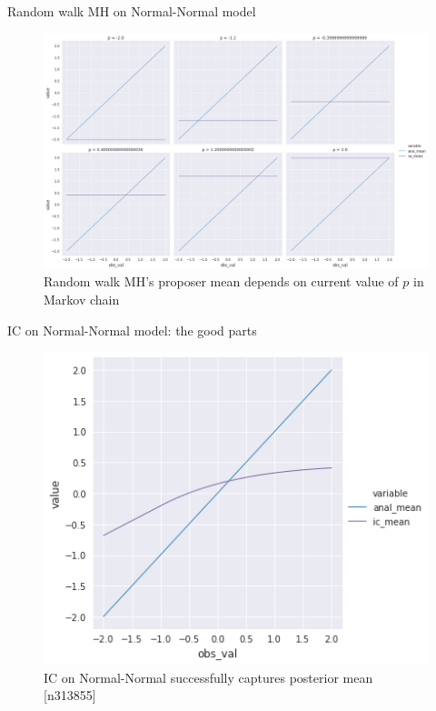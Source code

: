 \documentclass{beamer}
\begin{document}
\begin{frame}[fragile]{Random walk MH on Normal-Normal model}
    \begin{figure}
        \centering
        \includegraphics[width=\linewidth]{figures/rwmh.png}
        \caption{Random walk MH's proposer mean depends on current value of $p$ in Markov chain}
    \end{figure}
\end{frame}

\begin{frame}[fragile]{IC on Normal-Normal model: the good parts}
    \begin{figure}
        \centering
        \includegraphics[width=0.7\linewidth]{figures/ic_normal_normal.png}
        \caption{IC on Normal-Normal successfully captures posterior mean [n313855]}
    \end{figure}
\end{frame}
\end{document}
